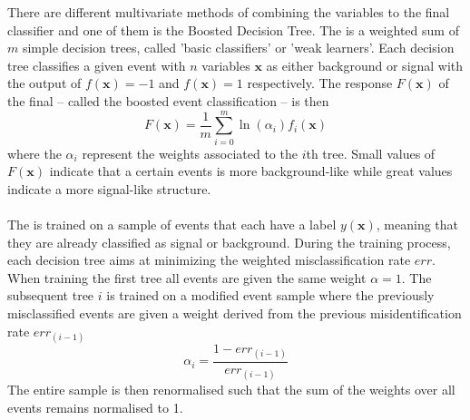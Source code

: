 There are different multivariate methods of combining the variables to the final classifier and one of them is the Boosted Decision Tree. The \bdtn is a weighted sum of $m$ simple decision trees, called 'basic classifiers' or 'weak learners'. Each decision tree classifies a given event with $n$ variables $\mathbf{x}$ as either background or signal with the output of $f(\mathbf{x}) = -1$ and $f(\mathbf{x}) = 1$ respectively. The response $F(\mathbf{x})$ of the final \bdtn -- called the boosted event classification -- is then
\begin{equation}
F(\mathbf{x}) =\frac{1}{m} \sum_{i=0}^m \ln(\alpha_i) f_i(\mathbf{x})
\end{equation}
where the $\alpha_i$ represent the weights associated to the $i$th tree. Small values of $F(\mathbf{x})$ indicate that a certain events is more background-like while great values indicate a more signal-like structure.\\
\\
The \bdtn is trained on a sample of events that each have a label $y(\mathbf{x})$, meaning that they are already classified as signal or background.
During the training process, each decision tree aims at minimizing the weighted misclassification rate $err$. When training the first tree all events are given the same weight $\alpha = 1$. The subsequent tree $i$ is trained on a modified event sample where the previously misclassified events are given a weight derived from the previous misidentification rate $err_{(i-1)}$
\begin{equation}
\alpha_{i} = \frac{1 - err_{(i-1)}}{err_{(i-1)}}
\end{equation}
The entire sample is then renormalised such that the sum of the weights over all events remains normalised to 1.\\


